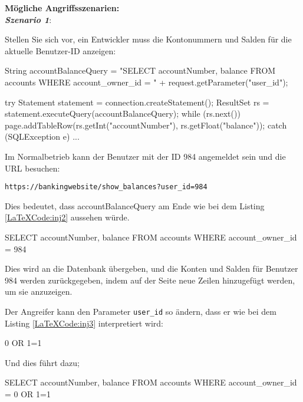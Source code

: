 \textbf{Mögliche Angriffsszenarien:}\\

\textbf{\textit{Szenario 1}}:

Stellen Sie sich vor, ein Entwickler muss die Kontonummern und Salden für die aktuelle Benutzer-ID anzeigen\cite{vcinj16}:

\begin{LaTeXCode}[caption={SQL Abfrage Beispiel 1},captionpos=b, label=LaTeXCode:inj1][numbers=none]
String accountBalanceQuery = 
"SELECT accountNumber, balance FROM accounts WHERE account_owner_id = " 
+ request.getParameter("user_id");

try
{
	Statement statement = connection.createStatement();
	ResultSet rs = statement.executeQuery(accountBalanceQuery);
	while (rs.next()) {
		page.addTableRow(rs.getInt("accountNumber"), rs.getFloat("balance"));
	}
} catch (SQLException e) { ... }
\end{LaTeXCode}

Im Normalbetrieb kann der Benutzer mit der ID 984 angemeldet sein und die URL besuchen:

\texttt{https://bankingwebsite/show\_balances?user\_id=984}

Dies bedeutet, dass accountBalanceQuery am Ende wie bei dem Listing \ref{LaTeXCode:inj2} aussehen würde.

\begin{LaTeXCode}[caption={Account Balance Query},captionpos=b, label=LaTeXCode:inj2][numbers=none]
SELECT accountNumber, balance FROM accounts WHERE account_owner_id = 984
\end{LaTeXCode}

Dies wird an die Datenbank übergeben, und die Konten und Salden für Benutzer 984 werden zurückgegeben, indem auf der Seite neue Zeilen hinzugefügt werden, um sie anzuzeigen.

Der Angreifer kann den Parameter \texttt{user\_id} so ändern, dass er wie bei dem Listing \ref{LaTeXCode:inj3} interpretiert wird:

\begin{LaTeXCode}[caption={Parameter},captionpos=b, label=LaTeXCode:inj3][numbers=none]
0 OR 1=1
\end{LaTeXCode}

Und dies führt dazu;

\begin{LaTeXCode}[caption={Account Balance Query},captionpos=b, label=LaTeXCode:inj4][numbers=none]
SELECT accountNumber, balance FROM accounts WHERE account_owner_id = 0 OR 1=1
\end{LaTeXCode}

